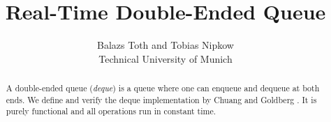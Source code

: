 \documentclass[11pt,a4paper]{article}
\begin{document}
\title{Real-Time Double-Ended Queue}
\author{Balazs Toth and Tobias Nipkow\\Technical University of Munich}
\maketitle

\begin{abstract}
A double-ended queue (\emph{deque}) is a queue where one can
enqueue and dequeue at both ends. We define and verify the deque
implementation by Chuang and Goldberg \cite{ChuangG93}. It is purely functional and all
operations run in constant time.
\end{abstract}

\tableofcontents





\end{document}
